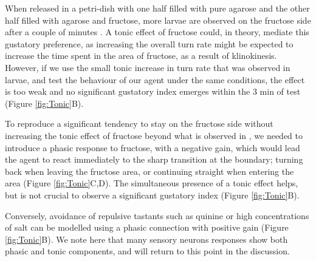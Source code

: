 \documentclass[11pt,a4paper]{article}
\newcommand{\todoBW}[1]{\todo[author=BW,color=orange, size=\tiny,inline]{#1}}
\begin{document}
When released in a petri-dish with one half filled with pure agarose and the other half filled with agarose and fructose, more larvae are observed on the fructose side after a couple of minutes \citep{schleyer2011behavior}. A tonic effect of fructose could, in theory, mediate this gustatory preference, as increasing the overall turn rate might be expected to increase the time spent in the area of fructose, as a result of klinokinesis.
 However, if we use the small tonic increase in turn rate that was observed in larvae, and test the behaviour of our agent under the same conditions, the effect is too weak and no significant gustatory index emerges within the 3 min of test (Figure \ref{fig:Tonic}B).

 To reproduce a significant tendency to stay on the fructose side without increasing the tonic effect of fructose beyond what is observed in \cite{schleyer2015learning}, we needed to introduce a phasic response to fructose, with a negative gain, which would lead the agent to react immediately to the sharp transition at the boundary; turning back when leaving the fructose area, or continuing straight when entering the area (Figure \ref{fig:Tonic}C,D). The simultaneous presence of a tonic effect helps, but is not crucial to observe a significant gustatory index (Figure \ref{fig:Tonic}B).

  Conversely, avoidance of repulsive tastants such as quinine or high concentrations of salt \citep{schleyer2011behavior} can be modelled using a phasic connection with positive gain (Figure \ref{fig:Tonic}B). We note here that many sensory neurons responses show both phasic and tonic components, and will return to this point in the discussion.
\end{document}
